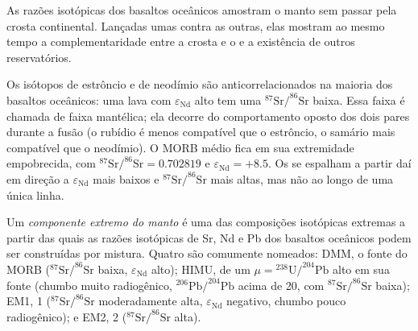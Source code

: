 As razões isotópicas dos basaltos oceânicos amostram o manto sem passar pela
crosta continental. Lançadas umas contra as outras, elas mostram ao mesmo tempo a
complementaridade entre a crosta e o  e a existência de outros
reservatórios.

Os isótopos de estrôncio e de neodímio são anticorrelacionados na maioria dos basaltos oceânicos: uma
lava com $\varepsilon_{\mathrm{Nd}}$ alto tem uma
$^{87}\mathrm{Sr}/^{86}\mathrm{Sr}$ baixa. Essa faixa é chamada de faixa mantélica; ela decorre
do comportamento oposto dos dois pares durante a fusão (o rubídio é menos
compatível que o estrôncio, o samário mais compatível que o neodímio). O MORB
médio fica em sua extremidade empobrecida, com $^{87}\mathrm{Sr}/^{86}\mathrm{Sr} = 0.702819$ e
$\varepsilon_{\mathrm{Nd}} = +8.5$. Os  se espalham a partir daí em direção a
$\varepsilon_{\mathrm{Nd}}$ mais baixos e $^{87}\mathrm{Sr}/^{86}\mathrm{Sr}$ mais altas, mas não
ao longo de uma única linha.

\begin{definition}\label{def:b2:isotope-geochemistry:end-members}
Um \emph{componente extremo do manto} é uma das composições
isotópicas extremas a partir das quais as razões isotópicas de Sr, Nd e Pb dos basaltos
oceânicos podem ser construídas por mistura. Quatro são comumente nomeados: DMM, o  fonte do MORB ($^{87}\mathrm{Sr}/^{86}\mathrm{Sr}$ baixa, $\varepsilon_{\mathrm{Nd}}$ alto);
HIMU, de um $\mu = {}^{238}\mathrm{U}/^{204}\mathrm{Pb}$ alto em sua fonte
(chumbo muito radiogênico, $^{206}\mathrm{Pb}/^{204}\mathrm{Pb}$ acima de 20, com
$^{87}\mathrm{Sr}/^{86}\mathrm{Sr}$ baixa); EM1,  1 ($^{87}\mathrm{Sr}/^{86}\mathrm{Sr}$
moderadamente alta, $\varepsilon_{\mathrm{Nd}}$ negativo, chumbo
pouco radiogênico); e EM2,  2 ($^{87}\mathrm{Sr}/^{86}\mathrm{Sr}$ alta).
\end{definition}

